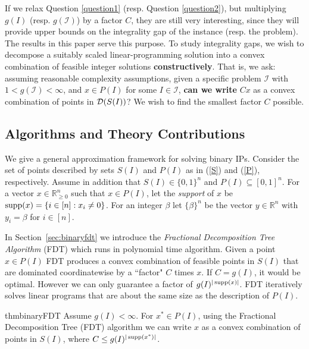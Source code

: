 If we relax Question \ref{question1} (resp. Question \ref{question2}), but multiplying $g(I)$ (resp. $g(\mathcal{I})$) by a factor $C$, they are still very interesting, since they will provide upper bounds on the integrality gap of the instance (resp. the problem). The results in this paper serve this purpose.
\fi
To study integrality gaps, we wish to decompose a suitably scaled linear-programming solution into a convex combination of feasible integer solutions {\bf constructively}.  That is, we ask: assuming reasonable complexity assumptions, given a specific problem $\mathcal{I}$ with  $1<g(\mathcal{I})<\infty$, and $x\in P(I)$ for some $I\in \mathcal{I}$, \textbf{can we write} $Cx$ as a convex combination of points in $\operatorname{\mathcal{D}}(S(I))$? We wish to find the smallest factor $C$ possible.

\subsection{Algorithms and Theory Contributions} 
 
We give a general approximation framework for solving binary IPs.
Consider the set of points described by sets $S(I)$ and $P(I)$ as in (\ref{S}) and (\ref{P}), respectively. Assume in addition that $S(I)\in \{0,1\}^n$ and $P(I)\subseteq [0,1]^n$.
For a vector $x\in \mathbb{R}_{\geq 0}^n$ such that $x\in P(I)$, let the {\em support} of $x$ be $\operatorname{supp}(x)= \{i \in [n]: x_i \neq 0\}$. For an integer $\beta$ let $\{\beta\}^n$ be the vector $y\in \mathbb{R}^n$ with $y_i=\beta$ for $i\in [n]$.


In Section~\ref{sec:binaryfdt} we introduce the \textit{Fractional Decomposition Tree Algorithm} (FDT) which runs in polynomial time algorithm. Given a point $x\in P(I)$ FDT produces a convex combination of feasible points in $S(I)$ that are dominated coordinatewise by a ``factor" $C$ times $x$.
If $C = g(I)$, it would be optimal. However we can only guarantee a factor of $g(I)^{|\operatorname{supp}(x)|}$. FDT iteratively solves linear programs that are about the same size as the description of $P(I)$.

\begin{restatable}{thm}{binaryFDT}
	\label{binaryFDT}
	Assume $g(I) 	<\infty$. For $x^*\in P(I)$, using 	the Fractional Decomposition Tree (FDT) algorithm we can write $x$ as a convex combination of points in $S(I)$, where $C\leq g(I)^{|\operatorname{supp}(x^*)|}$.
\end{restatable}

